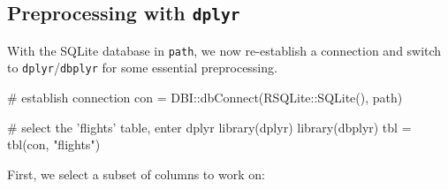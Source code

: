 \documentclass[
  11pt,
  parskip=half,
  DIV=calc,
  BCOR=10mm,
  x11names]{scrbook}
\newenvironment{Shaded}{}{}
\newcommand{\CommentTok}[1]{\textcolor[rgb]{0.00,0.50,0.00}{#1}}
\newcommand{\DataTypeTok}[1]{#1}
\newcommand{\DecValTok}[1]{#1}
\newcommand{\KeywordTok}[1]{\textcolor[rgb]{0.00,0.00,1.00}{#1}}
\newcommand{\NormalTok}[1]{#1}
\newcommand{\OperatorTok}[1]{#1}
\newcommand{\StringTok}[1]{\textcolor[rgb]{0.00,0.50,0.50}{#1}}
\begin{document}
\begin{Shaded}
\end{Shaded}

\hypertarget{preprocessing-with-dplyr}{%
\subsection{\texorpdfstring{Preprocessing with \texttt{dplyr}}{Preprocessing with dplyr}}\label{preprocessing-with-dplyr}}

With the SQLite database in \texttt{path}, we now re-establish a connection and switch to \texttt{dplyr}/\texttt{dbplyr} for some essential preprocessing.

\begin{Shaded}
\begin{Highlighting}[]
\CommentTok{# establish connection}
\NormalTok{con =}\StringTok{ }\NormalTok{DBI}\OperatorTok{::}\KeywordTok{dbConnect}\NormalTok{(RSQLite}\OperatorTok{::}\KeywordTok{SQLite}\NormalTok{(), path)}

\CommentTok{# select the 'flights' table, enter dplyr}
\KeywordTok{library}\NormalTok{(dplyr)}
\KeywordTok{library}\NormalTok{(dbplyr)}
\NormalTok{tbl =}\StringTok{ }\KeywordTok{tbl}\NormalTok{(con, }\StringTok{"flights"}\NormalTok{)}
\end{Highlighting}
\end{Shaded}

First, we select a subset of columns to work on:
\end{document}
